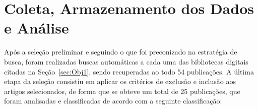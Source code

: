 

\section{Coleta, Armazenamento dos Dados e Análise}

Após a seleção preliminar e seguindo o que foi preconizado na estratégia de busca, foram realizadas buscas automáticas a cada uma das bibliotecas digitais citadas na Seção~\ref{sec:Obj1}, sendo recuperadas ao todo 54 publicações. A última etapa da seleção consistiu em aplicar os critérios de exclusão e inclusão aos artigos selecionados, de forma que se obteve um total de 25 publicações, que foram analisadas e classificadas de acordo com a seguinte classificação:

